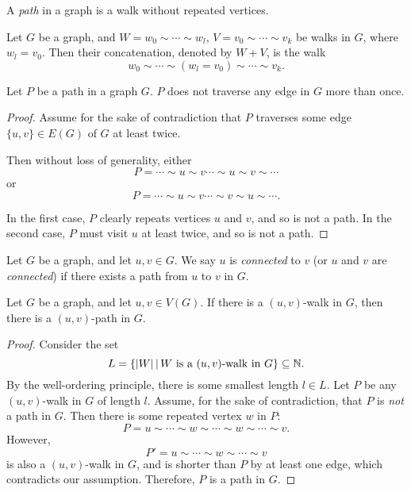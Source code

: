 \begin{defn}
    A \emph{path} in a graph is a walk without repeated vertices.
\end{defn}

\begin{defn}
    Let $G$ be a graph, and $W = w_0 \sim \cdots \sim w_l$, $V = v_0 \sim \cdots \sim v_k$ be walks in $G$, where $w_l = v_0$. Then their concatenation, denoted by $W + V$, is the walk \[w_0 \sim \cdots \sim (w_l = v_0) \sim \cdots \sim v_k.\]
\end{defn}

\begin{prop}
    Let $P$ be a path in a graph $G$. $P$ does not traverse any edge in $G$ more than once.
\end{prop}

\begin{proof}
    Assume for the sake of contradiction that $P$ traverses some edge $\{u, v\} \in E(G)$ of $G$ at least twice.

    Then without loss of generality, either \[P = \cdots \sim u \sim v \cdots \sim u \sim v \sim \cdots\] or \[P = \cdots \sim u \sim v \cdots \sim v \sim u \sim \cdots.\]

    In the first case, $P$ clearly repeats vertices $u$ and $v$, and so is not a path. In the second case, $P$ must visit $u$ at least twice, and so is not a path.
\end{proof}

\begin{defn}
    Let $G$ be a graph, and let $u, v \in G$. We say $u$ is \emph{connected} to $v$ (or $u$ and $v$ are \emph{connected}) if there exists a path from $u$ to $v$ in $G$.
\end{defn}

\begin{lemma}\label{walk-implies-path}
    Let $G$ be a graph, and let $u, v \in V(G)$. If there is a $(u, v)$-walk in $G$, then there is a $(u, v)$-path in $G$.
\end{lemma}

\begin{proof}
    Consider the set \[L = \left\{|W| \,\middle|\, W \textrm{ is a $(u, v)$-walk in } G\right\} \subseteq \mathbb{N}.\] By the well-ordering principle, there is some smallest length $l \in L$. Let $P$ be any $(u,v)$-walk in $G$ of length $l$. Assume, for the sake of contradiction, that $P$ is \emph{not} a path in $G$. Then there is some repeated vertex $w$ in $P$: \[P = u \sim \cdots \sim w \sim \cdots \sim w \sim \cdots \sim v.\] However, \[P' = u \sim \cdots \sim w \sim \cdots \sim v\] is also a $(u, v)$-walk in $G$, and is shorter than $P$ by at least one edge, which contradicts our assumption. Therefore, $P$ is a path in $G$.
\end{proof}

